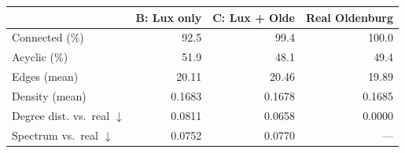 \begin{tabular}{lrrr}
\toprule
 & B: Lux only & C: Lux + Olde & Real Oldenburg \\
\midrule
Connected (\%) & 92.5 & 99.4 & 100.0 \\
Acyclic (\%) & 51.9 & 48.1 & 49.4 \\
Edges (mean) & 20.11 & 20.46 & 19.89 \\
Density (mean) & 0.1683 & 0.1678 & 0.1685 \\
\midrule
Degree dist. vs.\ real $\downarrow$ & 0.0811 & 0.0658 & 0.0000 \\
Spectrum vs.\ real $\downarrow$ & 0.0752 & 0.0770 & --- \\
\bottomrule
\end{tabular}
